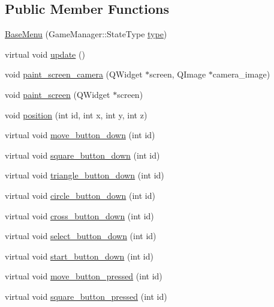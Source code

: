 \subsection*{Public Member Functions}
\begin{DoxyCompactItemize}
\item 
\hyperlink{class_base_menu_a4b6db156f76cc8ed156dfce7baf941e4}{Base\-Menu} (Game\-Manager\-::\-State\-Type \hyperlink{class_game_state_afc2d4395529e7ecba05379a8f5f224c5}{type})
\item 
virtual void \hyperlink{class_base_menu_a4679a8f7c2872606910baa1b08fe0ba1}{update} ()
\item 
void \hyperlink{class_base_menu_ad75153fdfff53b0421beb9674c0237e3}{paint\-\_\-screen\-\_\-camera} (Q\-Widget $\ast$screen, Q\-Image $\ast$camera\-\_\-image)
\item 
void \hyperlink{class_base_menu_ae45dccc7c3b8da62b4cd0d5b6c211a12}{paint\-\_\-screen} (Q\-Widget $\ast$screen)
\item 
void \hyperlink{class_base_menu_a9c2bc1403e96c1bd411883a47e47155b}{position} (int id, int x, int y, int z)
\item 
virtual void \hyperlink{class_base_menu_a8a1dbfb5c20ec003050e92e016bcde6a}{move\-\_\-button\-\_\-down} (int id)
\item 
virtual void \hyperlink{class_base_menu_adf4b11d9031d6ed0919fee1692bb1261}{square\-\_\-button\-\_\-down} (int id)
\item 
virtual void \hyperlink{class_base_menu_ac948643ada097b818c3f9b9e3249dc68}{triangle\-\_\-button\-\_\-down} (int id)
\item 
virtual void \hyperlink{class_base_menu_a272616b4c8caa96e086e727127a02aa2}{circle\-\_\-button\-\_\-down} (int id)
\item 
virtual void \hyperlink{class_base_menu_a5ef0f20274ea6470de07f15f34450f72}{cross\-\_\-button\-\_\-down} (int id)
\item 
virtual void \hyperlink{class_base_menu_a2b0ee601bce564f9cd1870c704025677}{select\-\_\-button\-\_\-down} (int id)
\item 
virtual void \hyperlink{class_base_menu_a2e7b8a119848a67c9375cbefb7bdbc69}{start\-\_\-button\-\_\-down} (int id)
\item 
virtual void \hyperlink{class_base_menu_a0a9ed550dbeb47f37528c0ab85790e68}{move\-\_\-button\-\_\-pressed} (int id)
\item 
virtual void \hyperlink{class_base_menu_aa8983e9c373ef131412d8fde71c735f8}{square\-\_\-button\-\_\-pressed} (int id)
\item 

\end{DoxyCompactItemize}
